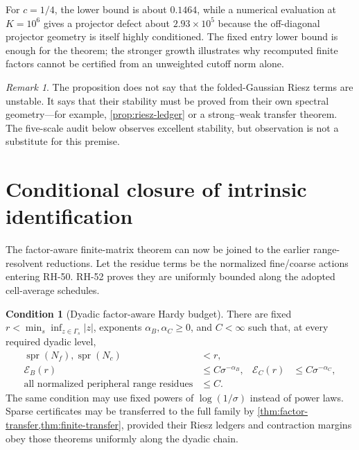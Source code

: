 \documentclass[11pt]{article}
\theoremstyle{definition}
\newtheorem{condition}[theorem]{Condition}
\theoremstyle{remark}
\newtheorem{remark}[theorem]{Remark}
\newcommand{\cE}{\mathcal E}
\newcommand{\spr}{\operatorname{spr}}
\begin{document}
For $c=1/4$, the lower bound is about $0.1464$, while a numerical evaluation
at $K=10^6$ gives a projector defect about $2.93\times10^5$ because the
off-diagonal projector geometry is itself highly conditioned.  The fixed
entry lower bound is enough for the theorem; the stronger growth illustrates
why recomputed finite factors cannot be certified from an unweighted cutoff
norm alone.

\begin{remark}
The proposition does not say that the folded-Gaussian Riesz terms are
unstable.  It says that their stability must be proved from their own
spectral geometry---for example, \cref{prop:riesz-ledger} or a strong--weak
transfer theorem.  The five-scale audit below observes excellent stability,
but observation is not a substitute for this premise.
\end{remark}

\section{Conditional closure of intrinsic identification}

The factor-aware finite-matrix theorem can now be joined to the earlier
range-resolvent reductions.  Let the residue terms be the normalized
fine/coarse actions entering RH-50.  RH-52 proves they are uniformly bounded
along the adopted cell-average schedules.

\begin{condition}[Dyadic factor-aware Hardy budget]
\label{cond:hardy-budget}
There are fixed $r<\min_s\inf_{z\in\Gamma_s}|z|$, exponents
$\alpha_B,\alpha_C\ge0$, and $C<\infty$ such that, at every required dyadic
level,
\begin{align}
 \spr(N_f),\spr(N_c)&<r,
 \label{eq:radius-condition}\\
 \cE_B(r)&\le C\sigma^{-\alpha_B},
 &\cE_C(r)&\le C\sigma^{-\alpha_C},
 \label{eq:energy-powers}\\
 \text{all normalized peripheral range residues}&\le C.
 \label{eq:residue-condition}
\end{align}
The same condition may use fixed powers of $\log(1/\sigma)$ instead of
power laws.  Sparse certificates may be transferred to the full family by
\cref{thm:factor-transfer,thm:finite-transfer}, provided their Riesz ledgers
and contraction margins obey those theorems uniformly along the dyadic
chain.
\end{condition}
\end{document}
